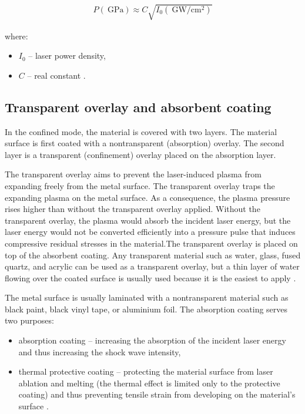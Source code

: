 \begin{gather} \label{approx}
P(\SI{}{\giga\pascal}) \approx C\sqrt{I_{0} (\SI{}{\giga\watt\per\cm\squared})}
\end{gather} 

where:

\begin{itemize}
    \item $I_{0}$ -- laser power density,
    \item $C$ -- real constant \cite{fabbro_fournier_ballard_devaux_virmont_1990}.

\end{itemize}

\subsection{Transparent overlay and absorbent coating}

In the confined mode, the material is covered with two layers. The material surface is first coated with a nontransparent (absorption) overlay. The second layer is a transparent (confinement) overlay placed on the absorption layer.

The transparent overlay aims to prevent the laser-induced plasma from expanding freely from the metal surface.  The transparent overlay traps the expanding plasma on the metal surface. As a consequence, the plasma pressure rises higher than without the transparent overlay applied. Without the transparent overlay, the plasma would absorb the incident laser energy, but the laser energy would not be converted efficiently into a pressure pulse that induces compressive residual stresses in the material.The transparent overlay is placed on top of the absorbent coating. Any transparent material such as water, glass, fused quartz, and acrylic can be used as a transparent overlay, but a thin layer of water flowing over the coated surface is usually used because it is the easiest to apply \cite{clauer_lahrman_2001}.

The metal surface is usually laminated with a nontransparent material such as black paint, black vinyl tape, or aluminium foil. The absorption coating serves two purposes:

\begin{itemize}
    \item absorption coating -- increasing the absorption of the incident laser energy and thus increasing the shock wave intensity,
    \item thermal protective coating -- protecting the material surface from laser ablation and melting (the thermal effect is limited only to the protective coating) and thus preventing tensile strain from developing on the material's surface \cite{hong_wang_guo_wu_wang_dai_xia_xie_1998}.
\end{itemize}

